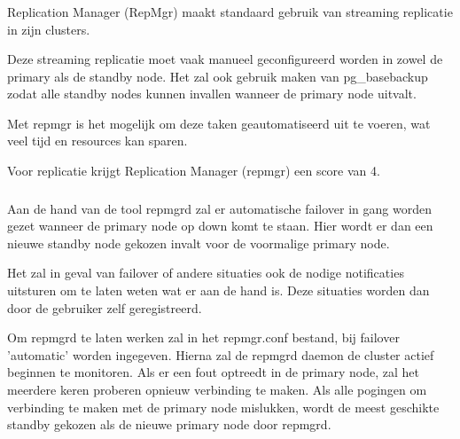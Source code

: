 
\subsubsection{}
\label{subsubsec:Replicatie}

Replication Manager (RepMgr) maakt standaard gebruik van streaming replicatie in zijn clusters.

Deze streaming replicatie moet vaak manueel geconfigureerd worden in zowel de primary als de standby node. Het zal ook gebruik maken van pg\_basebackup zodat alle standby nodes kunnen invallen wanneer de primary node uitvalt.

Met repmgr is het mogelijk om deze taken geautomatiseerd uit te voeren, wat veel tijd en resources kan sparen.

Voor replicatie krijgt Replication Manager (repmgr) een score van 4.

\subsubsection{}
\label{subsubsec:Failover}


Aan de hand van de tool repmgrd zal er automatische failover in gang worden gezet wanneer de primary node op down komt te staan. Hier wordt er dan een nieuwe standby node gekozen invalt voor de voormalige primary node.  

Het zal in geval van failover of andere situaties ook de nodige notificaties uitsturen om te laten weten wat er aan de hand is. Deze situaties worden dan door de gebruiker zelf geregistreerd.

Om repmgrd te laten werken zal in het repmgr.conf bestand, bij failover 'automatic' worden ingegeven. Hierna zal de repmgrd daemon de cluster actief beginnen te monitoren. Als er een fout optreedt in de primary node, zal het meerdere keren proberen opnieuw verbinding te maken. Als alle pogingen om verbinding te maken met de primary node mislukken, wordt de meest geschikte standby gekozen als de nieuwe primary node door repmgrd.

